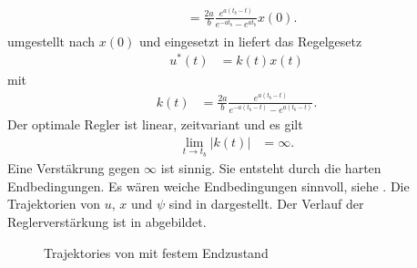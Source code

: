 \begin{exmp}
\begin{align}
\begin{split}
	& = \frac{2a}{b}\frac{e^{a(t_b-t)}}{e^{-at_b}-e^{at_b}} x(0).
\end{split}
\end{align}
 umgestellt nach $x(0)$ und eingesetzt in  liefert das Regelgesetz
\begin{align}
	u^{\ast}(t) & = k(t) x(t)
\end{align}
mit
\begin{align*}
	k(t) & = \frac{2a}{b}\frac{e^{a(t_b-t)}}{e^{-a(t_b-t)}-e^{a(t_b-t)}}.
\end{align*}
Der optimale Regler ist linear, zeitvariant und es gilt
\begin{align*}
	\lim\limits_{t\rightarrow t_b}\left|k(t)\right| & = \infty.
\end{align*}
Eine Verstäkrung gegen $\infty$ ist sinnig. Sie entsteht durch die harten Endbedingungen. Es wären weiche Endbedingungen sinnvoll, siehe
. Die Trajektorien von $u$, $x$ und $\psi$ sind in  dargestellt. Der Verlauf der
Reglerverstärkung ist in  abgebildet. 
\end{exmp}
\begin{figure}[htb]
	\centering
	
	\caption{Trajektories von  mit festem Endzustand}
	\label{fig:kap_2_vor_optlsg_exmp_1}
\end{figure}
